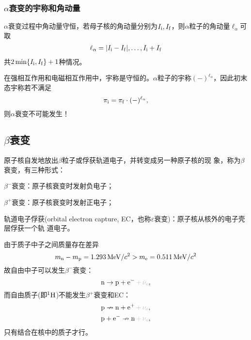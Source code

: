 \subsubsection[{\textit{\textalpha}衰变的宇称和角动量}]{$\alpha$衰变的宇称和角动量}
$\alpha$衰变过程中角动量守恒，若母子核的角动量分别为$I_{\mathrm{i}},I_{\mathrm{f}}$，则$\alpha$粒子的角动量$\ell_\alpha$可取
\begin{align}
	\ell_\alpha=|I_{\mathrm{i}}-I_{\mathrm{f}}|,\ldots,I_{\mathrm{i}}+I_{\mathrm{f}}
\end{align}
共$2\min\{I_{\mathrm{i}},I_{\mathrm{f}}\}+1$种情况。

在强相互作用和电磁相互作用中，宇称是守恒的。$\alpha$粒子的宇称$(-)^{\ell_\alpha}$，因此初末态宇称若不满足
\begin{align}
	\pi_{\mathrm{i}}=\pi_{\mathrm{f}}\cdot(-)^{\ell_\alpha},
\end{align}
则$\alpha$衰变不可能发生！
\subsection[\textit{\textbeta}衰变]{$\beta$衰变}
原子核自发地放出$\beta$粒子或俘获轨道电子，并转变成另一种原子核的现
象，称为$\beta$衰变，有三种形式：
\begin{compactenum}
	\item $\beta^-$衰变：原子核衰变时发射负电子；
	\item $\beta^+$衰变：原子核衰变时发射正电子；
	\item 轨道电子俘获(orbital electron capture, EC，也称$\varepsilon$衰变)：原子核从核外的电子壳层俘获一个轨
	道电子。
\end{compactenum}

由于质子中子之间质量存在差异
\[
	m_\nton - m_\pton = \SI{1.293}{\MeV}/c^2 > m_\elc = \SI{0.511}{MeV}/c^2
\]
故自由中子可以发生$\beta^-$衰变：
\[
	\nton\to\pton+\elc^-\textcolor{lightgray}{\,+\,\bar\nu_\elc},
\]
而自由质子(即${^{1}\mathrm{H}}$)不能发生$\beta^+$衰变和EC：
\begin{gather*}
	\pton\nrightarrow \nton+\elc^+\textcolor{lightgray}{\,+\,\nu_\elc},\\
	\pton+\elc^-\nrightarrow \nton\textcolor{lightgray}{\,+\,\nu_\elc},
\end{gather*}
只有结合在核中的质子才行。

